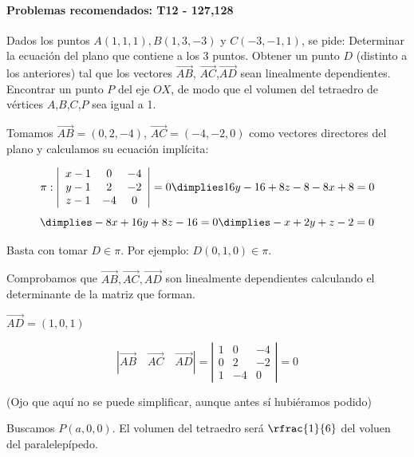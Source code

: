 \paragraph{Problemas recomendados: T12 - 127,128}

\begin{problem}[Junio 2019]

Dados los puntos $A(1,1,1), B(1,3,-3)$ y $C(-3,-1,1)$, se pide:
\ppart Determinar la ecuación del plano que contiene a los 3 puntos.
\ppart Obtener un punto $D$ (distinto a los anteriores) tal que los vectores $\vec{AB}$, $\vec{AC}$,$\vec{AD}$ sean linealmente dependientes.
\ppart Encontrar un punto $P$ del eje $OX$, de modo que el volumen del tetraedro de vértices $A$,$B$,$C$,$P$ sea igual a 1.

\solution

\spart 

Tomamos $\vec{AB} = (0,2,-4)$, $\vec{AC} = (-4,-2,0)$ como vectores directores del plano y calculamos su ecuación implícita:

\[
\pi: \left|\begin{array}{ccc}
x - 1 & 0 & -4\\
y - 1 & 2 & -2\\
z - 1 & -4& 0
\end{array}\right| = 0 \dimplies 16y-16 + 8z-8-8x+8 = 0\]
\[\dimplies -8x + 16y + 8z -16 = 0 \dimplies -x+2y+z-2=0
\]

\spart Basta con tomar $D\in\pi$. Por ejemplo: $D(0,1,0)\in\pi$.

Comprobamos que $\vec{AB},\vec{AC},\vec{AD}$ son linealmente dependientes calculando el determinante de la matriz que forman.

$\vec{AD} = (1,0,1)$

\[
|\vec{AB}\quad\vec{AC}\quad\vec{AD}| = 
\left|\begin{array}{ccc}
1 & 0 & -4\\
0 & 2 & -2\\
1 & -4& 0
\end{array}\right| = 0
\]

\spart 

(Ojo que aquí no se puede simplificar, aunque antes sí hubiéramos podido)

Buscamos $P(a,0,0)$. El volumen del tetraedro será $\rfrac{1}{6}$ del voluen del paralelepípedo.


\end{problem}
